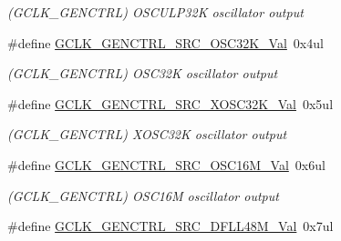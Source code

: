 \begin{DoxyCompactItemize}
\begin{DoxyCompactList}\small\item\em (G\+C\+L\+K\+\_\+\+G\+E\+N\+C\+T\+R\+L) O\+S\+C\+U\+L\+P32\+K oscillator output \end{DoxyCompactList}\item 
\hypertarget{group___s_a_m_l21___g_c_l_k_ga79a91b96132812e2d8fec7fb79dc6cde}{}\#define \hyperlink{group___s_a_m_l21___g_c_l_k_ga79a91b96132812e2d8fec7fb79dc6cde}{G\+C\+L\+K\+\_\+\+G\+E\+N\+C\+T\+R\+L\+\_\+\+S\+R\+C\+\_\+\+O\+S\+C32\+K\+\_\+\+Val}~0x4ul\label{group___s_a_m_l21___g_c_l_k_ga79a91b96132812e2d8fec7fb79dc6cde}

\begin{DoxyCompactList}\small\item\em (G\+C\+L\+K\+\_\+\+G\+E\+N\+C\+T\+R\+L) O\+S\+C32\+K oscillator output \end{DoxyCompactList}\item 
\hypertarget{group___s_a_m_l21___g_c_l_k_ga087326ba1d0ac766f2835e5460c72ef0}{}\#define \hyperlink{group___s_a_m_l21___g_c_l_k_ga087326ba1d0ac766f2835e5460c72ef0}{G\+C\+L\+K\+\_\+\+G\+E\+N\+C\+T\+R\+L\+\_\+\+S\+R\+C\+\_\+\+X\+O\+S\+C32\+K\+\_\+\+Val}~0x5ul\label{group___s_a_m_l21___g_c_l_k_ga087326ba1d0ac766f2835e5460c72ef0}

\begin{DoxyCompactList}\small\item\em (G\+C\+L\+K\+\_\+\+G\+E\+N\+C\+T\+R\+L) X\+O\+S\+C32\+K oscillator output \end{DoxyCompactList}\item 
\hypertarget{group___s_a_m_l21___g_c_l_k_ga12a4820422471b9d5b5c82fd5f0c0ebc}{}\#define \hyperlink{group___s_a_m_l21___g_c_l_k_ga12a4820422471b9d5b5c82fd5f0c0ebc}{G\+C\+L\+K\+\_\+\+G\+E\+N\+C\+T\+R\+L\+\_\+\+S\+R\+C\+\_\+\+O\+S\+C16\+M\+\_\+\+Val}~0x6ul\label{group___s_a_m_l21___g_c_l_k_ga12a4820422471b9d5b5c82fd5f0c0ebc}

\begin{DoxyCompactList}\small\item\em (G\+C\+L\+K\+\_\+\+G\+E\+N\+C\+T\+R\+L) O\+S\+C16\+M oscillator output \end{DoxyCompactList}\item 
\hypertarget{group___s_a_m_l21___g_c_l_k_ga70357963bac751c47a0b097568f1ec34}{}\#define \hyperlink{group___s_a_m_l21___g_c_l_k_ga70357963bac751c47a0b097568f1ec34}{G\+C\+L\+K\+\_\+\+G\+E\+N\+C\+T\+R\+L\+\_\+\+S\+R\+C\+\_\+\+D\+F\+L\+L48\+M\+\_\+\+Val}~0x7ul\label{group___s_a_m_l21___g_c_l_k_ga70357963bac751c47a0b097568f1ec34}


\end{DoxyCompactItemize}
